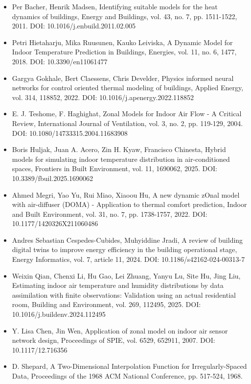 \documentclass[12pt,a4paper]{article}
\begin{document}
\begin{itemize}
\item [1] Per Bacher, Henrik Madsen, Identifying suitable models for the heat dynamics of buildings, Energy and Buildings, vol. 43, no. 7, pp. 1511-1522, 2011. DOI: 10.1016/j.enbuild.2011.02.005
\item [2] Petri Hietaharju, Mika Ruusunen, Kauko Leiviska, A Dynamic Model for Indoor Temperature Prediction in Buildings, Energies, vol. 11, no. 6, 1477, 2018. DOI: 10.3390/en11061477
\item [3] Gargya Gokhale, Bert Claessens, Chris Develder, Physics informed neural networks for control oriented thermal modeling of buildings, Applied Energy, vol. 314, 118852, 2022. DOI: 10.1016/j.apenergy.2022.118852
\item [4] E. J. Teshome, F. Haghighat, Zonal Models for Indoor Air Flow - A Critical Review, International Journal of Ventilation, vol. 3, no. 2, pp. 119-129, 2004. DOI: 10.1080/14733315.2004.11683908
\item [5] Boris Huljak, Juan A. Acero, Zin H. Kyaw, Francisco Chinesta, Hybrid models for simulating indoor temperature distribution in air-conditioned spaces, Frontiers in Built Environment, vol. 11, 1690062, 2025. DOI: 10.3389/fbuil.2025.1690062
\item [6] Ahmed Megri, Yao Yu, Rui Miao, Xiaoou Hu, A new dynamic zOnal model with air-diffuser (DOMA) - Application to thermal comfort prediction, Indoor and Built Environment, vol. 31, no. 7, pp. 1738-1757, 2022. DOI: 10.1177/1420326X211060486
\item [7] Andres Sebastian Cespedes-Cubides, Muhyiddine Jradi, A review of building digital twins to improve energy efficiency in the building operational stage, Energy Informatics, vol. 7, article 11, 2024. DOI: 10.1186/s42162-024-00313-7
\item [8] Weixin Qian, Chenxi Li, Hu Gao, Lei Zhuang, Yanyu Lu, Site Hu, Jing Liu, Estimating indoor air temperature and humidity distributions by data assimilation with finite observations: Validation using an actual residential room, Building and Environment, vol. 269, 112495, 2025. DOI: 10.1016/j.buildenv.2024.112495
\item [9] Y. Lisa Chen, Jin Wen, Application of zonal model on indoor air sensor network design, Proceedings of SPIE, vol. 6529, 652911, 2007. DOI: 10.1117/12.716356
\item [10] D. Shepard, A Two-Dimensional Interpolation Function for Irregularly-Spaced Data, Proceedings of the 1968 ACM National Conference, pp. 517-524, 1968.

\end{itemize}
\end{document}
